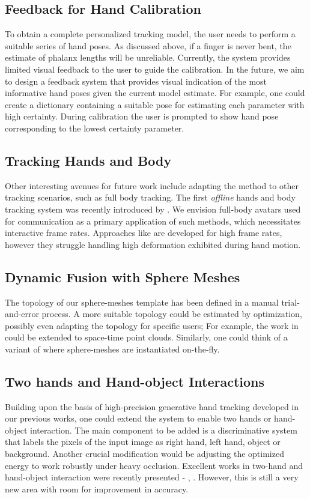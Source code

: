 \subsection*{Feedback for Hand Calibration}
To obtain a complete personalized tracking model, the user needs to perform a suitable series of hand poses. As discussed above, if a finger is never bent, the estimate of phalanx lengths will be unreliable. Currently, the system provides limited visual feedback to the user to guide the calibration. In the future, we aim to design a feedback system that provides visual indication of the most informative hand poses given the current model estimate. For example, one could create a dictionary containing a suitable pose for estimating each parameter with high certainty. During calibration the user is prompted to show hand pose corresponding to the lowest certainty parameter. 

\subsection*{Tracking Hands and Body}
Other interesting avenues for future work include adapting the method to other tracking scenarios, such as full body tracking. The first \textit{offline} hands and body tracking system was recently introduced by \cite{romero2017embodied}. We envision full-body avatars used for communication as a primary application of such methods, which necessitates interactive frame rates. Approaches like \cite{ dou2017motion2fusion} are developed for high frame rates, however they struggle handling high deformation exhibited during hand motion.

\subsection*{Dynamic Fusion with Sphere Meshes}
The topology of our sphere-meshes template has been defined in a manual trial-and-error process. A more suitable topology could be estimated by optimization, possibly even adapting the topology for specific users; For example, the work in \cite{thiery2016spheremesh} could be extended to space-time point clouds. Similarly, one could think of a variant of \cite{newcombe2015dynfusion} where sphere-meshes are instantiated on-the-fly. 

\subsection*{Two hands and Hand-object Interactions}
Building upon the basis of high-precision generative hand tracking developed in our previous works, one could extend the system to enable two hands or hand-object interaction. The main component to be added is a discriminative system that labels the pixels of the input image as right hand, left hand, object or background. Another crucial modification would be adjusting the optimized energy to work robustly under heavy occlusion. Excellent works in two-hand and hand-object interaction were recently presented -  \cite{taylor2017articulated}, \cite{mueller2017real}. However, this is still a very new area with room for improvement in accuracy.

